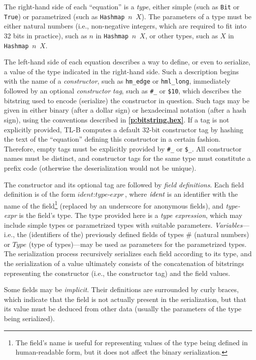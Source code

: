 \documentclass[12pt,oneside]{article}
\def\refpoint#1{{\rm\textbf{\ref{#1}}}}
\let\ptref=\refpoint
\let\tp=\textit
\def\Type{\tp{Type}}
\begin{document}
The right-hand side of each ``equation'' is a {\em type}, either simple (such as {\tt Bit} or {\tt True}) or parametrized (such as {\tt Hashmap $n$ $X$}). The parameters of a type must be either natural numbers (i.e., non-negative integers, which are required to fit into 32 bits in practice), such as $n$ in {\tt Hashmap $n$ $X$}, or other types, such as $X$ in {\tt Hashmap $n$ $X$}.

The left-hand side of each equation describes a way to define, or even to serialize, a value of the type indicated in the right-hand side. Such a description begins with the name of a {\em constructor}, such as {\tt hm\_edge} or {\tt hml\_long}, immediately followed by an optional {\em constructor tag}, such as {\tt \#\_} or {\tt \$10}, which describes the bitstring used to encode (serialize) the constructor in question. Such tags may be given in either binary (after a dollar sign) or hexadecimal notation (after a hash sign), using the conventions described in \ptref{p:bitstring.hex}. If a tag is not explicitly provided, TL-B computes a default 32-bit constructor tag by hashing the text of the ``equation'' defining this constructor in a certain fashion. Therefore, empty tags must be explicitly provided by {\tt \#\_} or {\tt \$\_}. All constructor names must be distinct, and constructor tags for the same type must constitute a prefix code (otherwise the deserialization would not be unique).

The constructor and its optional tag are followed by {\em field definitions}. Each field definition is of the form ${\textit{ident}}:{\textit{type-expr}}$, where ${\textit{ident}}\/$ is an identifier with the name of the field\footnote{The field's name is useful for representing values of the type being defined in human-readable form, but it does not affect the binary serialization.} (replaced by an underscore for anonymous fields), and {\textit{type-expr}} is the field's type. The type provided here is a {\em type expression}, which may include simple types or parametrized types with suitable parameters. {\em Variables}---i.e., the (identifiers of the) previously defined fields of types $\#$ (natural numbers) or $\Type$ (type of types)---may be used as parameters for the parametrized types. The serialization process recursively serializes each field according to its type, and the serialization of a value ultimately consists of the concatenation of bitstrings representing the constructor (i.e., the constructor tag) and the field values.

Some fields may be {\em implicit}. Their definitions are surrounded by curly braces, which indicate that the field is not actually present in the serialization, but that its value must be deduced from other data (usually the parameters of the type being serialized).
\end{document}
